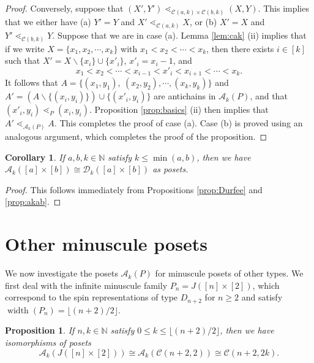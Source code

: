 \documentclass[11pt]{amsart}
\theoremstyle{plain}
\newtheorem{proposition}[theorem]{Proposition}
\newtheorem{corollary}[theorem]{Corollary}
\theoremstyle{definition}
\theoremstyle{remark}
\numberwithin{equation}{section}
\newcommand{\N}{\mathbb{N}}
\newcommand{\cala}{\mathcal{A}}
\newcommand{\calc}{\mathcal{C}}
\newcommand{\akp}{\mathcal{A}_k(P)}
\newcommand{\dkab}{\mathcal{D}_k([a]\times[b])}
\DeclareMathOperator{\width}{\mathrm{width}}
\begin{document}
\begin{proof}
Conversely, suppose that $(X', Y') \lessdot_{\calc(a, k) \times \calc(b, k)} (X,
Y)$. This implies that we either have (a) $Y' = Y$ and $X' \lessdot_{\calc(a, k)}
X$, or (b) $X' = X$ and $Y' \lessdot_{\calc(b, k)} Y$. Suppose that we are in
case (a). Lemma \ref{lem:cak} (ii) implies that if we write $X = \{x_1, x_2,
\cdots, x_k\}$ with $x_1 < x_2 < \cdots < x_k$, then there exists $i \in [k]$
such that $X' = X \backslash \{x_i\} \cup \{x'_i\}$, $x'_i = x_i - 1$, and $$
x_1 < x_2 < \cdots < x_{i-1} < x'_i < x_{i+1} < \cdots < x_k .$$ It follows that
$A = \{(x_1, y_1), \ (x_2, y_2), \cdots, (x_k, y_k)\}$ and $A' = (A \backslash
\{(x_i, y_i)\}) \cup \{(x'_i, y_i)\}$ are antichains in $\cala_k(P)$, and that
$(x'_i, y_i) \lessdot_P (x_i, y_i)$.  Proposition \ref{prop:basics} (ii) then
implies that $A' \lessdot_{\cala_k(P)} A$.  This completes the proof of case
(a). Case (b) is proved using an analogous argument, which completes the proof
of the proposition.
\end{proof}


\begin{corollary}
\label{cor:Durfee}
If $a,b,k\in \N$ satisfy $k\le\min(a,b)$, then we have $ \cala_k([a]\times
[b])\cong \dkab $ as posets.
\end{corollary}

\begin{proof}
This follows immediately from Propositions \ref{prop:Durfee} and
\ref{prop:akab}.
\end{proof}



\section{Other minuscule posets}
\label{sec:other_types}

We now investigate the posets $\akp$ for minuscule posets of other types.  We
first deal with the infinite minuscule family $P_n=J([n]\times [2])$, which
correspond to the spin representations of type $D_{n+2}$ for $n\ge 2$ and
satisfy $\width(P_n)=\lfloor (n+2)/2\rfloor$. 

\begin{proposition}
    \label{prop:Dspin}
    If $n,k\in \N$ satisfy $0\le k\le \lfloor (n+2)/2\rfloor$, then we have
    isomorphisms of posets \[ \cala_k(J([n]\times[2]))\cong
    \cala_k(\calc(n+2,2))\cong \calc(n+2,2k).  \]
\end{proposition}
\end{document}
